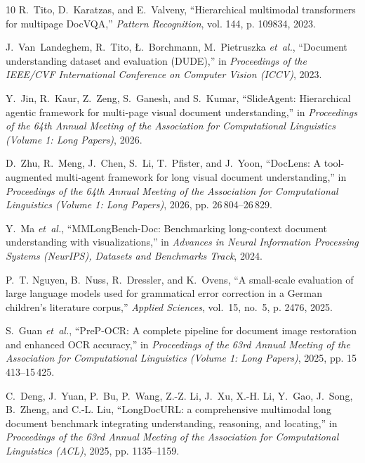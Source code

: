 \documentclass[conference]{IEEEtran}
\begin{document}
\begin{thebibliography}{10}
R.~Tito, D.~Karatzas, and E.~Valveny, ``Hierarchical multimodal transformers
  for multipage {DocVQA},'' \emph{Pattern Recognition}, vol. 144, p. 109834,
  2023.

J.~Van~Landeghem, R.~Tito, {\L}.~Borchmann, M.~Pietruszka \emph{et~al.},
  ``Document understanding dataset and evaluation ({DUDE}),'' in
  \emph{Proceedings of the IEEE/CVF International Conference on Computer Vision
  (ICCV)}, 2023.

Y.~Jin, R.~Kaur, Z.~Zeng, S.~Ganesh, and S.~Kumar, ``{SlideAgent}: Hierarchical
  agentic framework for multi-page visual document understanding,'' in
  \emph{Proceedings of the 64th Annual Meeting of the Association for
  Computational Linguistics (Volume 1: Long Papers)}, 2026.

D.~Zhu, R.~Meng, J.~Chen, S.~Li, T.~Pfister, and J.~Yoon, ``{DocLens}: A
  tool-augmented multi-agent framework for long visual document
  understanding,'' in \emph{Proceedings of the 64th Annual Meeting of the
  Association for Computational Linguistics (Volume 1: Long Papers)}, 2026, pp.
  26\,804--26\,829.

Y.~Ma \emph{et~al.}, ``{MMLongBench-Doc}: Benchmarking long-context document
  understanding with visualizations,'' in \emph{Advances in Neural Information
  Processing Systems (NeurIPS), Datasets and Benchmarks Track}, 2024.

P.~T. Nguyen, B.~Nuss, R.~Dressler, and K.~Ovens, ``A small-scale evaluation of
  large language models used for grammatical error correction in a {German}
  children's literature corpus,'' \emph{Applied Sciences}, vol.~15, no.~5, p.
  2476, 2025.

S.~Guan \emph{et~al.}, ``{PreP-OCR}: A complete pipeline for document image
  restoration and enhanced {OCR} accuracy,'' in \emph{Proceedings of the 63rd
  Annual Meeting of the Association for Computational Linguistics (Volume 1:
  Long Papers)}, 2025, pp. 15\,413--15\,425.

C.~Deng, J.~Yuan, P.~Bu, P.~Wang, Z.-Z. Li, J.~Xu, X.-H. Li, Y.~Gao, J.~Song,
  B.~Zheng, and C.-L. Liu, ``{LongDocURL}: a comprehensive multimodal long
  document benchmark integrating understanding, reasoning, and locating,'' in
  \emph{Proceedings of the 63rd Annual Meeting of the Association for
  Computational Linguistics (ACL)}, 2025, pp. 1135--1159.


\end{thebibliography}
\end{document}
